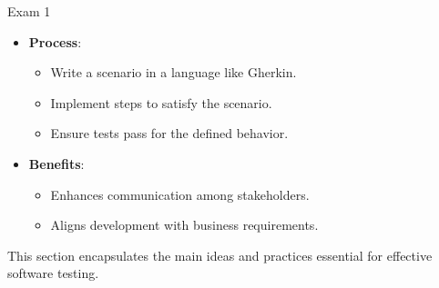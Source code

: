 \begin{examnotes}{Exam 1}
\begin{highlight}
        \begin{itemize}
            \item \textbf{Process}:
                \begin{itemize}
                    \item Write a scenario in a language like Gherkin.
                    \item Implement steps to satisfy the scenario.
                    \item Ensure tests pass for the defined behavior.
                \end{itemize}
            \item \textbf{Benefits}:
                \begin{itemize}
                    \item Enhances communication among stakeholders.
                    \item Aligns development with business requirements.
                \end{itemize}
        \end{itemize}
    \end{highlight}
    
    \begin{highlight}
        This section encapsulates the main ideas and practices essential for effective software testing.
        

\end{highlight}
\end{examnotes}
